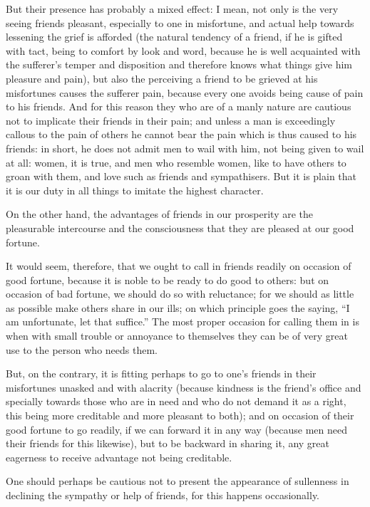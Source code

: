 But their presence has probably a mixed effect: I mean, not only is the very
seeing friends pleasant, especially to one in misfortune, and actual help
towards lessening the grief is afforded (the natural tendency of a friend, if
he is gifted with tact, being to comfort by look and word, because he is well
acquainted with the sufferer’s temper and disposition and therefore knows
what things give him pleasure and pain), but also the perceiving a friend to be
grieved at his misfortunes causes the sufferer pain, because every one avoids
being cause of pain to his friends. And for this reason they who are of a manly
nature are cautious not to implicate their friends in their pain; and unless a
man is exceedingly callous to the pain of others he cannot bear the pain which
is thus caused to his friends: in short, he does not admit men to wail with
him, not being given to wail at all: women, it is true, and men who resemble
women, like to have others to groan with them, and love such as friends and
sympathisers. But it is plain that it is our duty in all things to imitate the
highest character.

On the other hand, the advantages of friends in our prosperity are the
pleasurable intercourse and the consciousness that they are pleased at our good
fortune.

It would seem, therefore, that we ought to call in friends readily on occasion
of good fortune, because it is noble to be ready to do good to others: but on
occasion of bad fortune, we should do so with reluctance; for we should as
little as possible make others share in our ills; on which principle goes the
saying, “I am unfortunate, let that suffice.” The most proper
occasion for calling them in is when with small trouble or annoyance to
themselves they can be of very great use to the person who needs them.

But, on the contrary, it is fitting perhaps to go to one’s friends in
their misfortunes unasked and with alacrity (because kindness is the
friend’s office and specially towards those who are in need and who do
not demand it as a right, this being more creditable and more pleasant to
both); and on occasion of their good fortune to go readily, if we can forward
it in any way (because men need their friends for this likewise), but to be
backward in sharing it, any great eagerness to receive advantage not being
creditable.

One should perhaps be cautious not to present the appearance of sullenness in
declining the sympathy or help of friends, for this happens occasionally.


